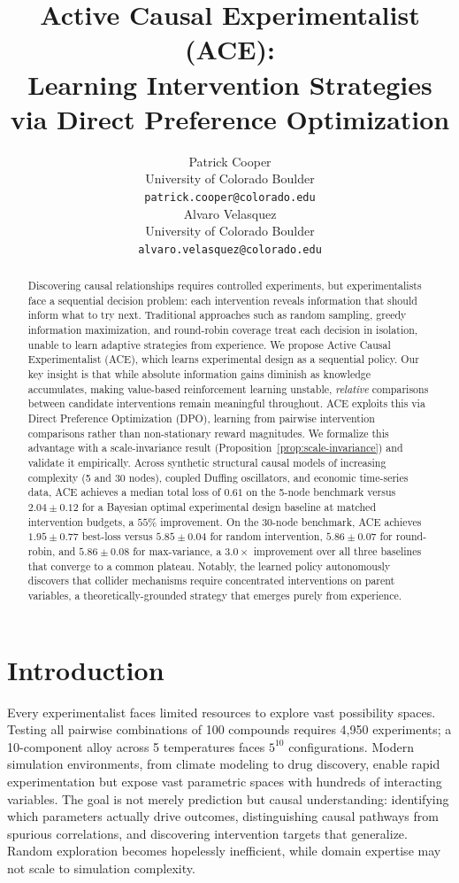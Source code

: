 \documentclass{article}
\title{Active Causal Experimentalist (ACE):\\Learning Intervention Strategies via Direct Preference Optimization}
\author{%
  Patrick Cooper\\
  University of Colorado Boulder\\
  \texttt{patrick.cooper@colorado.edu}\\
  \And
  Alvaro Velasquez\\
  University of Colorado Boulder\\
  \texttt{alvaro.velasquez@colorado.edu}\\
}
\theoremstyle{plain}
\theoremstyle{definition}
\theoremstyle{remark}
\begin{document}
\maketitle

\begin{abstract}
Discovering causal relationships requires controlled experiments, but experimentalists face a sequential decision problem: each intervention reveals information that should inform what to try next. Traditional approaches such as random sampling, greedy information maximization, and round-robin coverage treat each decision in isolation, unable to learn adaptive strategies from experience. We propose Active Causal Experimentalist (ACE), which learns experimental design as a sequential policy. Our key insight is that while absolute information gains diminish as knowledge accumulates, making value-based reinforcement learning unstable, \emph{relative} comparisons between candidate interventions remain meaningful throughout. ACE exploits this via Direct Preference Optimization (DPO), learning from pairwise intervention comparisons rather than non-stationary reward magnitudes. We formalize this advantage with a scale-invariance result (Proposition~\ref{prop:scale-invariance}) and validate it empirically. Across synthetic structural causal models of increasing complexity (5 and 30 nodes), coupled Duffing oscillators, and economic time-series data, ACE achieves a median total loss of $0.61$ on the 5-node benchmark versus $2.04\pm0.12$ for a Bayesian optimal experimental design baseline at matched intervention budgets, a $55\%$ improvement. On the 30-node benchmark, ACE achieves $1.95\pm0.77$ best-loss versus $5.85\pm0.04$ for random intervention, $5.86\pm0.07$ for round-robin, and $5.86\pm0.08$ for max-variance, a $3.0\times$ improvement over all three baselines that converge to a common plateau. Notably, the learned policy autonomously discovers that collider mechanisms require concentrated interventions on parent variables, a theoretically-grounded strategy that emerges purely from experience.
\end{abstract}

\section{Introduction}

Every experimentalist faces limited resources to explore vast possibility spaces. Testing all pairwise combinations of 100 compounds requires 4{,}950 experiments; a 10-component alloy across 5 temperatures faces $5^{10}$ configurations. Modern simulation environments, from climate modeling to drug discovery, enable rapid experimentation but expose vast parametric spaces with hundreds of interacting variables. The goal is not merely prediction but causal understanding: identifying which parameters actually drive outcomes, distinguishing causal pathways from spurious correlations, and discovering intervention targets that generalize. Random exploration becomes hopelessly inefficient, while domain expertise may not scale to simulation complexity.
\end{document}
